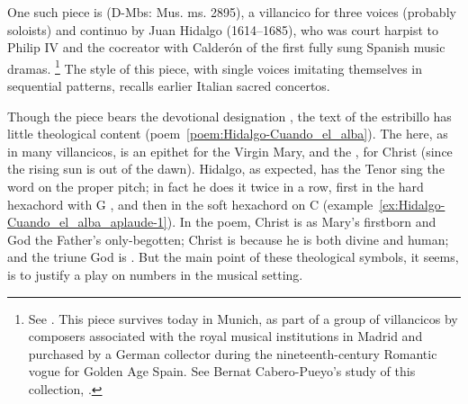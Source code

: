 One such piece is  (D-Mbs: Mus. ms. 2895), a villancico for three voices (probably soloists) and continuo by Juan Hidalgo (1614--1685), who was court harpist to Philip IV and the cocreator with Calderón of the first fully sung Spanish music dramas.%
	\footnote{%
See \autocite{Stein:Songs}.
This piece survives today in Munich, as part of a group of villancicos by composers associated with the royal musical institutions in Madrid and purchased by a German collector during the nineteenth-century Romantic vogue for Golden Age Spain.
See Bernat Cabero-Pueyo's study of this collection, .
	}
The style of this piece, with single voices imitating themselves in sequential patterns, recalls earlier Italian sacred concertos.

Though the piece bears the devotional designation  , the text of the estribillo has little theological content (poem~\ref{poem:Hidalgo-Cuando_el_alba}).
The  here, as in many villancicos, is an epithet for the Virgin Mary, and the , for Christ (since the rising sun is  out of the dawn).
Hidalgo, as expected, has the Tenor sing the word  on the proper pitch; in fact he does it twice in a row, first in the hard hexachord with G , and then in the soft hexachord on C  (example~\ref{ex:Hidalgo-Cuando_el_alba_aplaude-1}).
In the poem, Christ is  as Mary's firstborn and God the Father's only-begotten; Christ is  because he is both divine and human; and the triune God is .
But the main point of these theological symbols, it seems, is to justify a play on numbers in the musical setting.

%	

